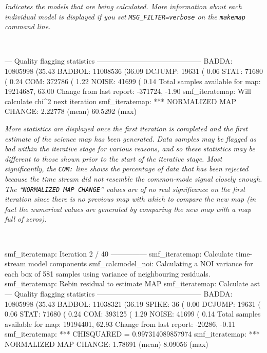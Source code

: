 \begin{terminalv}
\emph{Indicates the models that are being calculated. More information
about each individual model is displayed if you set
\texttt{MSG\_FILTER=verbose} on the \texttt{makemap} command line.}

~
\begin{terminalv}
--- Quality flagging statistics --------------------------------------------
 BADDA:   10805998 (35.43%
BADBOL:   11008536 (36.09%
DCJUMP:      19631 ( 0.06%
  STAT:      71680 ( 0.24%
   COM:     372786 ( 1.22%
 NOISE:      41699 ( 0.14%
Total samples available for map:   19214687, 63.00%
     Change from last report:    -371724, -1.90%
smf_iteratemap: Will calculate chi^2 next iteration
smf_iteratemap: *** NORMALIZED MAP CHANGE: 2.22778 (mean) 60.5292 (max)
\end{terminalv}

\emph{More statistics are displayed once the first iteration is completed
and the first estimate of the science map has been generated. Data
samples may be flagged as bad within the iterative stage for various
reasons, and so these statistics may be different to those shown prior to
the start of the iterative stage. Most significantly, the \texttt{COM:}
line shows the percentage of data that has been rejected because the time
stream did not resemble the common-mode signal closely enough. The
``\texttt{NORMALIZED MAP CHANGE}'' values are of no real significance on the
first iteration since there is no previous map with which to compare the
new map (in fact the numerical values are generated by comparing the new map
with a map full of zeros).}

~
\begin{terminalv}
smf_iteratemap: Iteration 2 / 40 ---------------
smf_iteratemap: Calculate time-stream model components
smf_calcmodel_noi: Calculating a NOI variance for each box of 581 samples
using variance of neighbouring residuals.
smf_iteratemap: Rebin residual to estimate MAP
smf_iteratemap: Calculate ast
--- Quality flagging statistics --------------------------------------------
 BADDA:   10805998 (35.43%
BADBOL:   11038321 (36.19%
 SPIKE:         36 ( 0.00%
DCJUMP:      19631 ( 0.06%
  STAT:      71680 ( 0.24%
   COM:     393125 ( 1.29%
 NOISE:      41699 ( 0.14%
Total samples available for map:   19194401, 62.93%
     Change from last report:     -20286, -0.11%
smf_iteratemap: *** CHISQUARED = 0.997314089857974
smf_iteratemap: *** NORMALIZED MAP CHANGE: 1.78691 (mean) 8.09056 (max)


\end{terminalv}
\end{terminalv}

